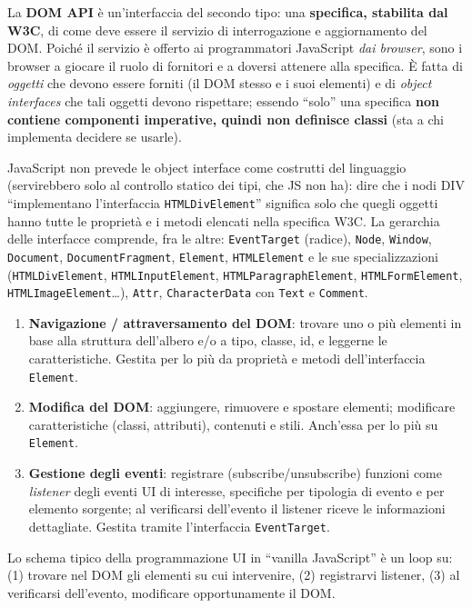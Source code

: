 \begin{definizione}
La \textbf{DOM API} \`e un'interfaccia del secondo tipo: una \textbf{specifica, stabilita dal
W3C}, di come deve essere il servizio di interrogazione e aggiornamento del DOM. Poich\'e il
servizio \`e offerto ai programmatori JavaScript \emph{dai browser}, sono i browser a giocare
il ruolo di fornitori e a doversi attenere alla specifica. \`E fatta di \emph{oggetti} che
devono essere forniti (il DOM stesso e i suoi elementi) e di \emph{object interfaces} che tali
oggetti devono rispettare; essendo ``solo'' una specifica \textbf{non contiene componenti
imperative, quindi non definisce classi} (sta a chi implementa decidere se usarle).
\end{definizione}

JavaScript non prevede le object interface come costrutti del linguaggio (servirebbero solo
al controllo statico dei tipi, che JS non ha): dire che i nodi DIV ``implementano
l'interfaccia \texttt{HTMLDivElement}'' significa solo che quegli oggetti hanno tutte le
propriet\`a e i metodi elencati nella specifica W3C. La gerarchia delle interfacce comprende,
fra le altre: \texttt{EventTarget} (radice), \texttt{Node}, \texttt{Window},
\texttt{Document}, \texttt{DocumentFragment}, \texttt{Element}, \texttt{HTMLElement} e le sue
specializzazioni (\texttt{HTMLDivElement}, \texttt{HTMLInputElement},
\texttt{HTMLParagraphElement}, \texttt{HTMLFormElement}, \texttt{HTMLImageElement}\dots),
\texttt{Attr}, \texttt{CharacterData} con \texttt{Text} e \texttt{Comment}.

\begin{importante}
\begin{enumerate}
  \item \textbf{Navigazione / attraversamento del DOM}: trovare uno o pi\`u elementi in base
        alla struttura dell'albero e/o a tipo, classe, id, e leggerne le caratteristiche.
        Gestita per lo pi\`u da propriet\`a e metodi dell'interfaccia \texttt{Element}.
  \item \textbf{Modifica del DOM}: aggiungere, rimuovere e spostare elementi; modificare
        caratteristiche (classi, attributi), contenuti e stili. Anch'essa per lo pi\`u su
        \texttt{Element}.
  \item \textbf{Gestione degli eventi}: registrare (subscribe/unsubscribe) funzioni come
        \emph{listener} degli eventi UI di interesse, specifiche per tipologia di evento e per
        elemento sorgente; al verificarsi dell'evento il listener riceve le informazioni
        dettagliate. Gestita tramite l'interfaccia \texttt{EventTarget}.
\end{enumerate}
Lo schema tipico della programmazione UI in ``vanilla JavaScript'' \`e un loop su:
(1) trovare nel DOM gli elementi su cui intervenire, (2) registrarvi listener,
(3) al verificarsi dell'evento, modificare opportunamente il DOM.
\end{importante}

